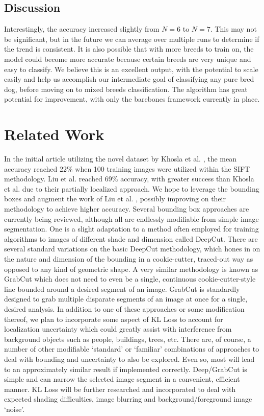 \documentclass[12pt]{article}
\begin{document}
\subsection{Discussion}

Interestingly, the accuracy increased slightly from $N=6$ to $N=7$. This may not be significant, but in the future we can average over multiple runs to determine if the trend is consistent. It is also possible that with more breeds to train on, the model could become more accurate because certain breeds are very unique and easy to classify. We believe this is an excellent output, with the potential to scale easily and help us accomplish our intermediate goal of classifying any pure bred dog, before moving on to mixed breeds classification. The algorithm has great potential for improvement, with only the barebones framework currently in place. 

\section{Related Work}

In the initial article utilizing the novel dataset by Khosla et al. \cite{khosla2011novel}, the mean accuracy reached 22\% when 100 training images were utilized within the SIFT methodology. Liu et al. \cite{liu2012dog} reached 69\% accuracy, with greater success than Khosla et al. \cite{khosla2011novel} due to their partially localized approach.  We hope to leverage the bounding boxes and augment the work of Liu et al. \cite{liu2012dog}, possibly improving on their methodology to achieve higher accuracy. Several bounding box approaches are currently being reviewed, although all are endlessly modifiable from simple image segmentation. One is a slight adaptation to a method often employed for training algorithms to images of different shade and dimension called DeepCut.  \cite{rajchl2016deepcut} There are several standard variations on the basic DeepCut methodology, which hones in on the nature and dimension of the bounding in a cookie-cutter, traced-out way as opposed to any kind of geometric shape. A very similar methodology is known as GrabCut which does not need to even be a single, continuous cookie-cutter-style line bounded around a desired segment of an image. GrabCut is standardly designed to grab multiple disparate segments of an image at once for a single, desired analysis. In addition to one of these approaches or some modification thereof, we plan to incorporate some aspect of KL Loss to account for localization uncertainty which could greatly assist with interference from background objects such as people, buildings, trees, etc. \cite{he2019bounding} There are, of course, a number of other modifiable ‘standard’ or ‘familiar’ combinations of approaches to deal with bounding and uncertainty to also be explored. Even so, most will lead to an approximately similar result if implemented correctly. Deep/GrabCut is simple and can narrow the selected image segment in a convenient, efficient manner. KL Loss will be further researched and incorporated to deal with expected shading difficulties, image blurring and background/foreground image ‘noise’.
\end{document}
